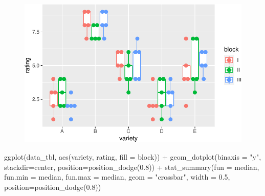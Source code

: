 \documentclass[
  letterpaper,
  DIV=11,
  oneside]{scrreport}
\newenvironment{Shaded}{\begin{snugshade}}{\end{snugshade}}
\newcommand{\AttributeTok}[1]{\textcolor[rgb]{0.40,0.45,0.13}{#1}}
\newcommand{\FloatTok}[1]{\textcolor[rgb]{0.68,0.00,0.00}{#1}}
\newcommand{\FunctionTok}[1]{\textcolor[rgb]{0.28,0.35,0.67}{#1}}
\newcommand{\NormalTok}[1]{\textcolor[rgb]{0.00,0.23,0.31}{#1}}
\newcommand{\SpecialCharTok}[1]{\textcolor[rgb]{0.37,0.37,0.37}{#1}}
\newcommand{\StringTok}[1]{\textcolor[rgb]{0.13,0.47,0.30}{#1}}
\begin{document}
\begin{figure}[H]

{\centering \includegraphics{./app-example-analysis_files/figure-pdf/unnamed-chunk-13-1.pdf}

}

\end{figure}

\begin{Shaded}
\begin{Highlighting}[]
\FunctionTok{ggplot}\NormalTok{(data\_tbl, }\FunctionTok{aes}\NormalTok{(variety, rating, }\AttributeTok{fill =}\NormalTok{ block)) }\SpecialCharTok{+}
  \FunctionTok{geom\_dotplot}\NormalTok{(}\AttributeTok{binaxis =} \StringTok{"y"}\NormalTok{, }\AttributeTok{stackdir=}\StringTok{\textquotesingle{}center\textquotesingle{}}\NormalTok{, }
               \AttributeTok{position=}\FunctionTok{position\_dodge}\NormalTok{(}\FloatTok{0.8}\NormalTok{)) }\SpecialCharTok{+}
  \FunctionTok{stat\_summary}\NormalTok{(}\AttributeTok{fun =}\NormalTok{ median, }\AttributeTok{fun.min =}\NormalTok{ median, }\AttributeTok{fun.max =}\NormalTok{ median,}
               \AttributeTok{geom =} \StringTok{"crossbar"}\NormalTok{, }\AttributeTok{width =} \FloatTok{0.5}\NormalTok{, }
               \AttributeTok{position=}\FunctionTok{position\_dodge}\NormalTok{(}\FloatTok{0.8}\NormalTok{)) }
\end{Highlighting}
\end{Shaded}
\end{document}
